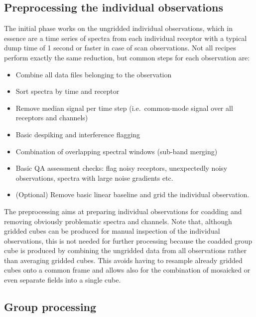 \documentclass[final,authoryear,5p,times,twocolumn]{elsarticle}
\begin{document}
\subsection{Preprocessing the individual observations}

The initial phase works on the ungridded individual observations,
which in essence are a time series of spectra from each individual
receptor with a typical dump time of 1 second or faster in case of scan
observations.  Not all recipes perform exactly the same reduction, but
common steps for each observation are:
\begin{itemize}
\item Combine all data files belonging to the observation
\item Sort spectra by time and receptor
\item Remove median signal per time step (i.e.\ common-mode signal over
all receptors and channels)
\item Basic despiking and interference flagging
\item Combination of overlapping spectral windows (sub-band merging)
\item Basic QA assessment checks: flag noisy receptors, unexpectedly noisy
observations, spectra with large noise gradients etc.
\item (Optional) Remove basic linear baseline and grid the individual
observation.
\end{itemize}

The preprocessing aims at preparing individual observations for
coadding and removing obviously problematic spectra and channels.
Note that, although gridded cubes can be produced for manual
inspection of the individual observations, this is not needed for
further processing because the coadded group cube is produced by
combining the ungridded data from all observations rather than
averaging gridded cubes.  This avoids having to resample already
gridded cubes onto a common frame and allows also for the combination
of mosaicked or even separate fields into a single cube.

\subsection{Group processing}
\end{document}
